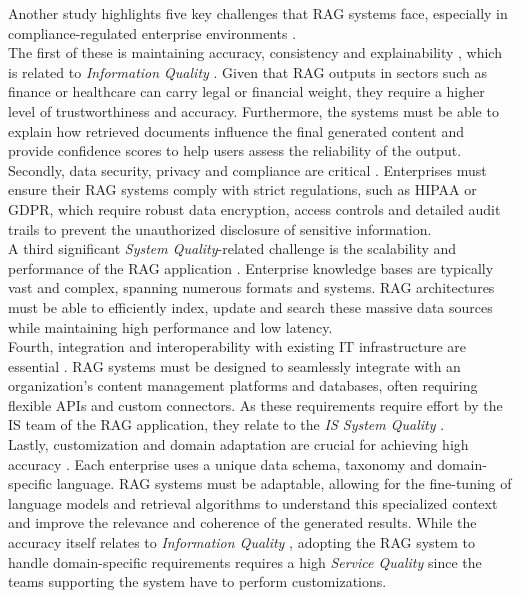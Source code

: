 \documentclass[
	english,
	ruledheaders=section,%
	class=report,%
	thesis={type=bachelor},%
	accentcolor=1b,%
	custommargins=true,%
	marginpar=false,%
	parskip=half-,%
	fontsize=11pt,%
	DIV=14,
]{tudapub}
\begin{document}
Another study highlights five key challenges that RAG systems face, especially in compliance-regulated enterprise environments \parencite[p.~6]{Bruckhaus2024RAG}.\\
The first of these is maintaining accuracy, consistency and explainability \parencite[p.~6]{Bruckhaus2024RAG}, which is related to \textit{Information Quality} \parencite[pp.~64--66]{DeloneMcLean1992ISSuccess}. Given that RAG outputs in sectors such as finance or healthcare can carry legal or financial weight, they require a higher level of trustworthiness and accuracy. Furthermore, the systems must be able to explain how retrieved documents influence the final generated content and provide confidence scores to help users assess the reliability of the output.\\
Secondly, data security, privacy and compliance are critical \parencite[p.~6]{Bruckhaus2024RAG}. Enterprises must ensure their RAG systems comply with strict regulations, such as HIPAA or GDPR, which require robust data encryption, access controls and detailed audit trails to prevent the unauthorized disclosure of sensitive information.\\
A third significant \textit{System Quality}-related \parencite[p.~64]{DeloneMcLean1992ISSuccess} challenge is the scalability and performance of the RAG application \parencite[p.~6]{Bruckhaus2024RAG}. Enterprise knowledge bases are typically vast and complex, spanning numerous formats and systems. RAG architectures must be able to efficiently index, update and search these massive data sources while maintaining high performance and low latency.\\
Fourth, integration and interoperability with existing IT infrastructure are essential \parencite[p.~6]{Bruckhaus2024RAG}. RAG systems must be designed to seamlessly integrate with an organization's content management platforms and databases, often requiring flexible APIs and custom connectors. As these requirements require effort by the IS team of the RAG application, they relate to the \textit{IS System Quality} \parencite[pp.~58--59]{Jennex2006}.\\
Lastly, customization and domain adaptation are crucial for achieving high accuracy \parencite[p.~6]{Bruckhaus2024RAG}. Each enterprise uses a unique data schema, taxonomy and domain-specific language. RAG systems must be adaptable, allowing for the fine-tuning of language models and retrieval algorithms to understand this specialized context and improve the relevance and coherence of the generated results. While the accuracy itself relates to \textit{Information Quality} \parencite[pp.~64--66]{DeloneMcLean1992ISSuccess}, adopting the RAG system to handle domain-specific requirements requires a high \textit{Service Quality} \parencite[p.~17]{DeloneMcLean2003ISSuccessTenYearUpdate} since the teams supporting the system have to perform customizations.\\
\end{document}
